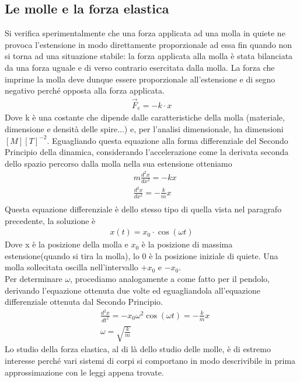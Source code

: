 \subsection{Le molle e la forza elastica}
Si verifica sperimentalmente che una forza applicata ad una molla in quiete ne provoca l'estensione in modo direttamente proporzionale ad essa fin quando non si torna ad una situazione stabile: la forza applicata alla molla è stata bilanciata da una forza uguale e di verso contrario esercitata dalla molla. La forza che imprime la molla deve dunque essere proporzionale all'estensione e di segno negativo perché opposta alla forza applicata. 
\begin{align*}
	\vec{F}_e = -k \cdot x
\end{align*}
Dove k è una costante che dipende dalle caratteristiche della molla (materiale, dimensione e densità delle spire...) e, per l'analisi dimensionale, ha dimensioni $[M][T]^{-2}$.
Eguagliando questa equazione alla forma differenziale del Secondo Principio della dinamica, considerando l'accelerazione come la derivata seconda dello spazio percorso dalla molla nella sua estensione otteniamo
\begin{align*}
	&m \frac{d^2x}{dx^2} = -kx\\
	&\frac{d^2x}{dx^2} = -\frac{k}{m}x\\
\end{align*}
Questa equazione differenziale è dello stesso tipo di quella vista nel paragrafo precedente, la soluzione è
\begin{align*}
	x(t) = x_0 \cdot \cos(\omega t)
\end{align*}
Dove x è la posizione della molla e $x_0$ è la posizione di massima estensione(quando si tira la molla), lo 0 è la posizione iniziale di quiete. Una molla sollecitata oscilla nell'intervallo $+x_0$ e $-x_0$.\\
Per determinare $\omega$, procediamo analogamente a come fatto per il pendolo, derivando l'equazione ottenuta due volte ed eguagliandola all'equazione differenziale ottenuta dal Secondo Principio.
\begin{align*}
	&\frac{d^2x}{dt^2}= -x_0 \omega^2 \cos(\omega t) = -\frac{k}{m}x\\
	&\omega = \sqrt{\frac{k}{m}}
\end{align*}
Lo studio della forza elastica, al di là dello studio delle molle, è di estremo interesse perché vari sistemi di corpi si comportano in modo descrivibile in prima approssimazione con le leggi appena trovate.
